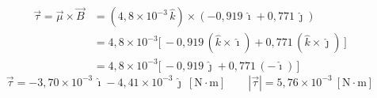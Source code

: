 \documentclass[12pt]{article}
\begin{document}
\begin{align*}
    \vec{\tau} = \vec{\mu}\times\vec{B}
       &= (4{,}8\times10^{-3}\,\hat{k})\times(-0{,}919\,\hat{\imath}+0{,}771\,\hat{\jmath}) \\
       &= 4{,}8\times10^{-3}\big[\,-0{,}919\,(\hat{k}\times\hat{\imath})
          + 0{,}771\,(\hat{k}\times\hat{\jmath})\,\big] \\
       &= 4{,}8\times10^{-3}\big[\,-0{,}919\,\hat{\jmath} + 0{,}771\,(-\hat{\imath})\,\big]
\end{align*}
\[
    \boxed{\vec{\tau} = -3{,}70\times10^{-3}\,\hat{\imath} - 4{,}41\times10^{-3}\,\hat{\jmath}\ [\text{N}\cdot\text{m}]}
    \qquad |\vec{\tau}| = 5{,}76\times10^{-3}\ [\text{N}\cdot\text{m}]
\]
\end{document}
